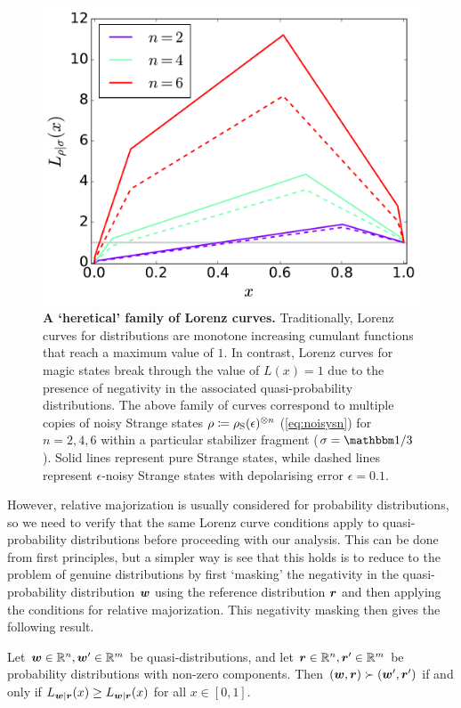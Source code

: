 \documentclass[pra,
aps,
twocolumn,
superscriptaddress,
groupedaddress,
nofootinbib,
reprint
]{revtex4-1}
\begin{document}
\begin{figure}
    \centering
    \includegraphics[scale=0.35]{figs/lc_strange.pdf}
    \caption{\textbf{A `heretical' family of Lorenz curves.} Traditionally, Lorenz curves for distributions are monotone increasing cumulant functions that reach a maximum value of $1$. In contrast, Lorenz curves for magic states break through the value of $L(x)=1$ due to the presence of negativity in the associated quasi-probability distributions. The above family of curves correspond to multiple copies of noisy Strange states $\rho\coloneqq\rho_{\rm{S}}(\epsilon)^{\otimes n}$ (\cref{eq:noisysn}) for $n=2,4,6$ within a particular stabilizer fragment ($\sigma = \id/3$). Solid lines represent pure Strange states, while dashed lines represent $\epsilon$-noisy Strange states with depolarising error $\epsilon = 0.1$.
    }
    \label{fig:lcs}
\end{figure}

However, relative majorization is usually considered for probability distributions, so we need to verify that the same Lorenz curve conditions apply to quasi-probability distributions before proceeding with our analysis. This can be done from first principles, but a simpler way is see that this holds is to reduce to the problem of genuine distributions by first `masking' the negativity in the quasi-probability distribution $\boldsymbol{w}$ using the reference distribution $\boldsymbol{r}$ and then applying the conditions for relative majorization. This negativity masking then gives the following result.

\begin{lemma} Let $\boldsymbol{w} \in \mathbb{R}^n,\boldsymbol{w}'\in \mathbb{R}^m$ be quasi-distributions, and let $\boldsymbol{r} \in \mathbb{R}^n, \boldsymbol{r}' \in \mathbb{R}^m$ be probability distributions with non-zero components. Then $(\boldsymbol{w}, \boldsymbol{r}) \succ (\boldsymbol{w}', \boldsymbol{r}')$ if and only if $L_{\boldsymbol{w}|\boldsymbol{r}}(x) \ge L_{\boldsymbol{w} |\boldsymbol{r}}(x)$ for all $x \in [0,1]$.
\end{lemma}
 
\end{document}
